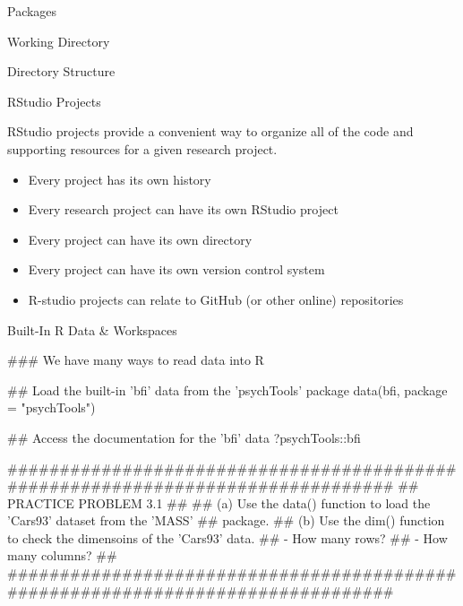 \documentclass[10pt]{beamer}
\begin{document}
\begin{frame}{Packages}
\begin{frame}{Working Directory}

\end{frame}


\begin{frame}{Directory Structure}

\end{frame}


\begin{frame}{RStudio Projects}

RStudio projects provide a convenient way to organize all of the code and 
supporting resources for a given research project.

\begin{itemize}
\item Every project has its own history
\item Every research project can have its own RStudio project
\item Every project can have its own directory
\item Every project can have its own version control system
\item R-studio projects can relate to GitHub (or other online) repositories
\end{itemize}

\end{frame}




\begin{frame}[fragile]{Built-In R Data \& Workspaces}
  
### We have many ways to read data into R

## Load the built-in 'bfi' data from the 'psychTools' package
data(bfi, package = "psychTools")

## Access the documentation for the 'bfi' data
?psychTools::bfi

################################################################################
## PRACTICE PROBLEM 3.1
##
## (a) Use the data() function to load the 'Cars93' dataset from the 'MASS'
##     package.
## (b) Use the dim() function to check the dimensoins of the 'Cars93' data.
##     - How many rows?
##     - How many columns?
##
################################################################################


\end{frame}
\end{frame}
\end{document}

